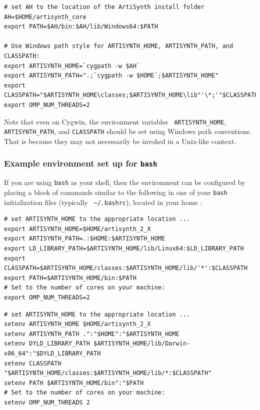 \begin{lstlisting}
# set AH to the location of the ArtiSynth install folder
AH=$HOME/artisynth_core
export PATH=$AH/bin:$AH/lib/Windows64:$PATH

# Use Windows path style for ARTISYNTH_HOME, ARTISYNTH_PATH, and CLASSPATH:
export ARTISYNTH_HOME=`cygpath -w $AH`
export ARTISYNTH_PATH=".;`cygpath -w $HOME`;$ARTISYNTH_HOME"
export CLASSPATH="$ARTISYNTH_HOME\classes;$ARTISYNTH_HOME\lib"'\*;'"$CLASSPATH"
export OMP_NUM_THREADS=2
\end{lstlisting}

Note that even on Cygwin, the environment variables {\tt
ARTISYNTH\_HOME}, {\tt ARTISYNTH\_PATH}, and {\tt CLASSPATH} should be
set using Windows path conventions. That is because they may not
necessarily be invoked in a Unix-like context.
\fi

\ifWindows\else
\subsubsection{Example environment set up for {\tt bash}}
\label{BashEnvironmentSetup}

If you are using {\tt bash} as your shell, then the environment can be
configured by placing a block of commands similar to the following in
one of your {\tt bash} initialization files (typically {\tt
\textasciitilde/.bashrc}), located in your home \directory:

\ifLinux
\begin{lstlisting}
# set ARTISYNTH_HOME to the appropriate location ...
export ARTISYNTH_HOME=$HOME/artisynth_2_X
export ARTISYNTH_PATH=.:$HOME:$ARTISYNTH_HOME
export LD_LIBRARY_PATH=$ARTISYNTH_HOME/lib/Linux64:$LD_LIBRARY_PATH
export CLASSPATH=$ARTISYNTH_HOME/classes:$ARTISYNTH_HOME/lib/'*':$CLASSPATH
export PATH=$ARTISYNTH_HOME/bin:$PATH
# Set to the number of cores on your machine:
export OMP_NUM_THREADS=2 
\end{lstlisting}
\else\ifMacOS
\begin{lstlisting}
# set ARTISYNTH_HOME to the appropriate location ...
setenv ARTISYNTH_HOME $HOME/artisynth_2_X
setenv ARTISYNTH_PATH .":"$HOME":"$ARTISYNTH_HOME
setenv DYLD_LIBRARY_PATH $ARTISYNTH_HOME/lib/Darwin-x86_64":"$DYLD_LIBRARY_PATH
setenv CLASSPATH "$ARTISYNTH_HOME/classes:$ARTISYNTH_HOME/lib/*:$CLASSPATH"
setenv PATH $ARTISYNTH_HOME/bin":"$PATH
# Set to the number of cores on your machine:
setenv OMP_NUM_THREADS 2 
\end{lstlisting}
\fi\fi

